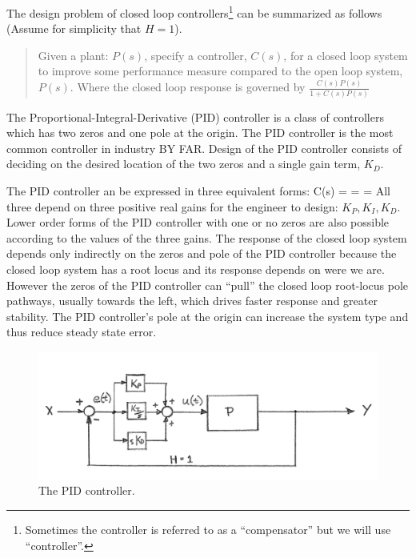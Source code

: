 The design problem of closed loop controllers\footnote{Sometimes the controller is referred to as a ``compensator'' but we will use ``controller''.} can be summarized as follows (Assume
for simplicity that $H=1$).

\begin{quotation}   Given a plant: $P(s)$,  specify a controller, $C(s)$, for a closed loop system to improve some performance measure compared to the open loop system, $P(s)$.
Where the closed loop response is governed by   $\frac{C(s)P(s)}{1 + C(s)P(s)}$
\end{quotation}



The Proportional-Integral-Derivative (PID) controller is a class of controllers which has
two zeros and one pole at the origin.  The PID controller is the most common controller in industry BY FAR.   Design of the PID controller consists of deciding on the desired
location of the two zeros and a single gain term, $K_D$.

The PID controller an be expressed in three equivalent forms:
\bq
C(s) =  =  =
\eq
All three depend on three positive real gains for the engineer to design: $K_P, K_I, K_D$.
Lower order forms of the PID
controller with one or no zeros are also possible according to the values of the three gains.
The response of the closed loop system depends only indirectly on the zeros and pole of the
PID controller because the  closed loop system has a root locus and its response depends on
were we are.   However the zeros of the PID controller can ``pull'' the closed loop root-locus
pole pathways, usually towards the left, which drives faster response and greater stability.
The PID controller's pole at the origin can increase the system type and thus reduce
steady state error.


\begin{figure}\centering
\includegraphics[width=5.0in]{figs11/00651a.png}
\caption{The PID controller.}\label{PIDBlockDiagram}
\end{figure}


